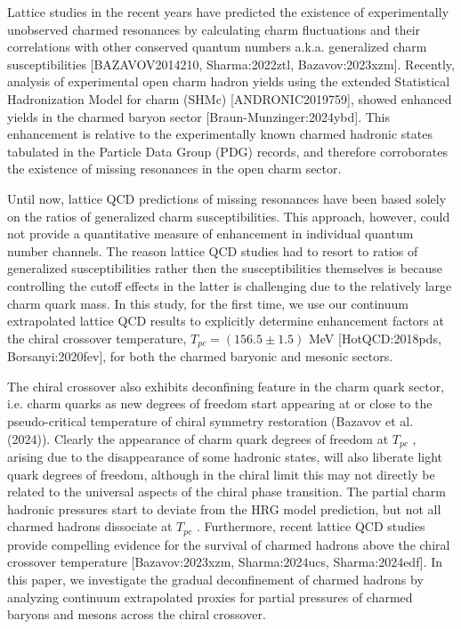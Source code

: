 \documentclass[11pt,a4paper]{article}
\begin{document}
Lattice studies in the recent years have predicted the existence of experimentally unobserved charmed resonances by calculating charm fluctuations and their correlations with other conserved quantum numbers a.k.a. generalized charm susceptibilities [BAZAVOV2014210, Sharma:2022ztl, Bazavov:2023xzm]. Recently, analysis of experimental  open charm hadron yields using the extended Statistical Hadronization Model for charm (SHMc) [ANDRONIC2019759], showed enhanced yields in the charmed baryon sector [Braun-Munzinger:2024ybd]. This enhancement is relative to the experimentally known charmed hadronic states tabulated in the Particle Data Group (PDG) records, and  therefore corroborates the existence of missing resonances in the open charm sector.

Until now, lattice QCD predictions of missing resonances have been based solely on the ratios of generalized charm susceptibilities. This approach, however, could not provide a quantitative measure of enhancement in individual quantum number channels. The reason lattice QCD studies had to resort to ratios of generalized susceptibilities rather then the susceptibilities themselves is because controlling the cutoff effects in the latter is challenging due to the relatively large charm quark mass.  In this study, for the first time, we use our continuum extrapolated lattice QCD results to explicitly determine enhancement factors at the chiral crossover temperature,  ${T_{pc}=(156.5\pm1.5)}$  MeV [HotQCD:2018pds, Borsanyi:2020fev], for both the charmed baryonic and mesonic sectors.

The chiral crossover also exhibits deconfining feature in the charm quark sector, i.e. charm quarks as new degrees of freedom start appearing at or close to the pseudo-critical temperature of chiral symmetry restoration (Bazavov et al. (2024)). Clearly the appearance of charm quark degrees of freedom at  $T_{pc}$ , arising due to the disappearance of some hadronic states, will also liberate light quark degrees of freedom, although in the chiral limit this may not directly be related to the universal aspects of the chiral phase transition. The partial charm hadronic pressures start to deviate from the HRG model prediction, but not all charmed hadrons dissociate at  $T_{pc}$ . Furthermore, recent lattice QCD studies provide compelling evidence for the survival of charmed hadrons above the chiral crossover temperature [Bazavov:2023xzm, Sharma:2024ucs, Sharma:2024edf]. In this paper, we investigate the gradual deconfinement of charmed hadrons by analyzing continuum extrapolated proxies for partial pressures of charmed baryons and mesons across the chiral crossover.
\end{document}
